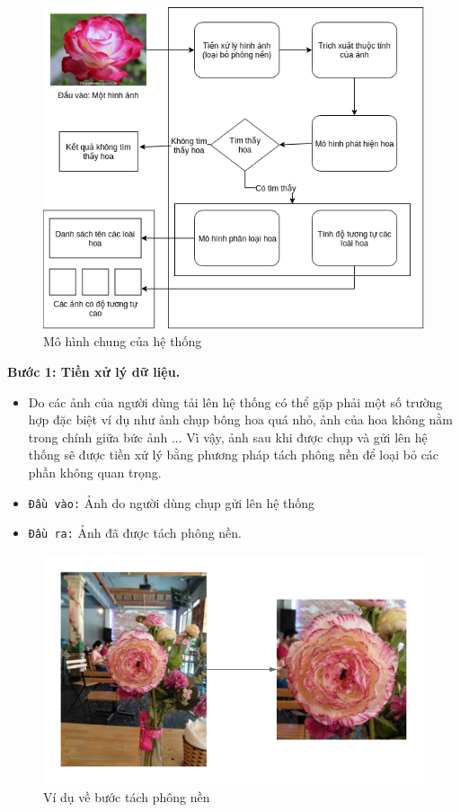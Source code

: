 \documentclass[12pt]{report}
\begin{document}
		\begin{figure}[h]
			\centering
			\includegraphics[scale=0.81]{mohinhchung}
			\caption{Mô hình chung của hệ thống}
			\label{fig:mohinhchung}
		\end{figure}
														
		\textbf{Bước 1: Tiền xử lý dữ liệu.} 
		\begin{itemize}
			\item Do các ảnh của người dùng tải lên hệ thống có thể gặp phải một số trường hợp đặc biệt ví dụ như ảnh chụp bông hoa quá nhỏ, ảnh của hoa không nằm trong chính giữa bức ảnh ... Vì vậy, ảnh sau khi được chụp và gửi lên hệ thống sẽ được tiền xử lý bằng phương pháp tách phông nền để loại bỏ các phần không quan trọng.
			\item \texttt{Đầu vào:} Ảnh do người dùng chụp gửi lên hệ thống
			\item \texttt{Đầu ra:} Ảnh đã được tách phông nền.
		\end{itemize}
														
		\begin{figure}[h]
			\centering
			\includegraphics[scale=0.4]{tach_phong_nen}
			\caption{Ví dụ về bước tách phông nền}
			\label{fig:tach_phong_nen}
		\end{figure}
														
\end{document}

